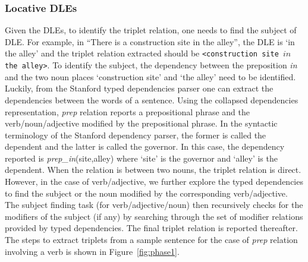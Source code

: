 \documentclass{acm_proc_article-sp}
\begin{document}
\subsubsection*{Locative DLEs}
Given the DLEs, to identify the triplet relation, one needs to find the subject of DLE. For example, in ``There is a construction site in the alley'', the DLE is `in the alley' and the triplet relation extracted should be \texttt{<construction site $in$ the alley>}. To  identify the subject, the dependency between the preposition \textit{in} and the two noun places `construction site' and `the alley' need to be identified. Luckily, from the Stanford typed dependencies parser \cite{marneffe:stanford} one can extract the dependencies between the words of a sentence. Using the collapsed dependencies representation, \textit{prep} relation reports a prepositional phrase and the verb/noun/adjective modified by the prepositional phrase. In the syntactic terminology of the Stanford dependency parser, the former is called the dependent and the latter is called the governor. In this case, the dependency reported is \textit{prep\_in}(site,alley) where `site' is the governor and `alley' is the dependent. When the relation is between two nouns, the triplet relation is direct.
However, in the case of verb/adjective, we further explore the typed dependencies to find the subject or the noun modified by the corresponding verb/adjective. The subject finding task (for verb/adjective/noun) then recursively checks for the modifiers of the subject (if any) by searching through the set of modifier relations provided by typed dependencies. The final triplet relation is reported thereafter. The steps to extract triplets from a sample sentence for the case of \textit{prep} relation involving a verb is shown in Figure~\ref{fig:phase1}.
\end{document}
